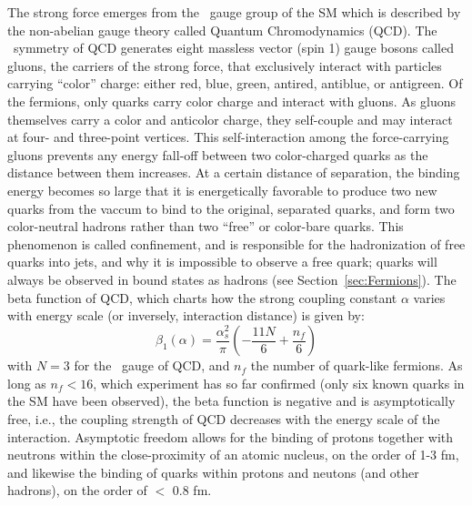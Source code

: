 The strong force emerges from the \SUthreeC~gauge group of the SM which is described by the non-abelian gauge theory called Quantum Chromodynamics (QCD). The \SUthreeC~symmetry of QCD generates eight massless vector (spin 1) gauge bosons called gluons, the carriers of the strong force, that exclusively interact with particles carrying ``color'' charge: either red, blue, green, antired, antiblue, or antigreen. Of the fermions, only quarks carry color charge and interact with gluons. As gluons themselves carry a color and anticolor charge, they self-couple and may interact at four- and three-point vertices. This self-interaction among the force-carrying gluons prevents any energy fall-off between two color-charged quarks as the distance between them increases. At a certain distance of separation, the binding energy becomes so large that it is energetically favorable to produce two new quarks from the vaccum to bind to the original, separated quarks, and form two color-neutral hadrons rather than two ``free'' or color-bare quarks. This phenomenon is called confinement, and is responsible for the hadronization of free quarks into jets, and why it is impossible to observe a free quark; quarks will always be observed in bound states as hadrons (see Section~\ref{sec:Fermions}).
The beta function of QCD, which charts how the strong coupling constant $\alpha$ varies with energy scale (or inversely, interaction distance) is given by:
\begin{equation}
    \beta_1(\alpha) = \frac{\alpha_s^2}{\pi}\left(-\frac{11N}{6}+\frac{n_f}{6}\right)
\end{equation}
with $N=3$ for the \SUthree~gauge of QCD, and $n_f$ the number of quark-like fermions. As long as $n_f<16$, which experiment has so far confirmed (only six known quarks in the SM have been observed), the beta function is negative and is asymptotically free, i.e., the coupling strength of QCD decreases with the energy scale of the interaction. Asymptotic freedom allows for the binding of protons together with neutrons within the close-proximity of an atomic nucleus, on the order of 1-3 fm, and likewise the binding of quarks within protons and neutons (and other hadrons), on the order of $<$ 0.8 fm. 
